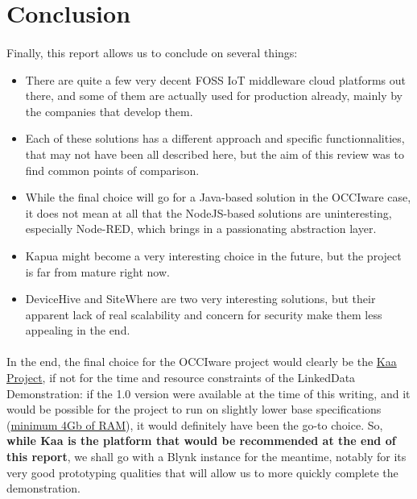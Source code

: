 \documentclass{article}
\begin{document}
\newpage

\section*{Conclusion}
%

\paragraph{} Finally, this report allows us to conclude on several things:

\begin{itemize}
\item There are quite a few very decent FOSS IoT middleware cloud platforms out there, and some of them are actually used for production already, mainly by the companies that develop them.
\item Each of these solutions has a different approach and specific functionnalities, that may not have been all described here, but the aim of this review was to find common points of comparison.
\item While the final choice will go for a Java-based solution in the OCCIware case, it does not mean at all that the NodeJS-based solutions are uninteresting, especially Node-RED, which brings in a passionating abstraction layer.
\item Kapua might become a very interesting choice in the future, but the project is far from mature right now.
\item DeviceHive and SiteWhere are two very interesting solutions, but their apparent lack of real scalability and concern for security make them less appealing in the end.
\end{itemize}

\paragraph{} In the end, the final choice for the OCCIware project would clearly be the \href{https://www.kaaproject.org/}{Kaa Project}, if not for the time and resource constraints of the LinkedData Demonstration: if the 1.0 version were available at the time of this writing, and it would be possible for the project to run on slightly lower base specifications (\href{https://kaaproject.github.io/kaa/docs/v0.10.0/Getting-started/#sandbox-installation}{minimum 4Gb of RAM}), it would definitely have been the go-to choice. So, \textbf{while Kaa is the platform that would be recommended at the end of this report}, we shall go with a Blynk instance for the meantime, notably for its very good prototyping qualities that will allow us to more quickly complete the demonstration.
\end{document}
